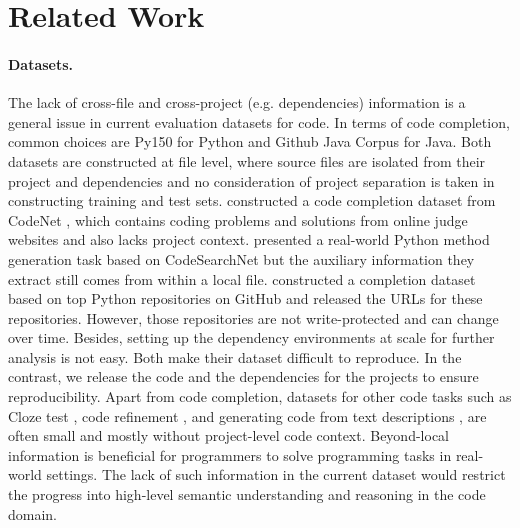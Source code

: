 \section{Related Work}
\label{sec:related-work}

\paragraph{Datasets.}
The lack of cross-file and cross-project (e.g. dependencies) information is a general issue in current evaluation datasets for code.
In terms of code completion, common choices are Py150 \citep{raychev2016probabilistic} for Python and Github Java Corpus \citep{allamanis2013mining} for Java. Both datasets are constructed at file level, where source files are isolated from their project and dependencies and no consideration of project separation is taken in constructing training and test sets.
\citet{lu2022reacc} constructed a code completion dataset from CodeNet \citep{puri2021project}, which contains coding problems and solutions from online judge websites and also lacks project context. 
\citet{clement2021long} presented a real-world Python method generation task based on CodeSearchNet \citep{husain2019codesearchnet} but the auxiliary information they extract still comes from within a local file. 
\citet{svyatkovskiy2021fast} constructed a completion dataset based on top Python repositories on GitHub and released the URLs for these repositories. 
However, those repositories are not write-protected and can change over time. Besides, setting up the dependency environments at scale for further analysis is not easy. 
Both make their dataset difficult to reproduce.
In the contrast, we release the code and the dependencies for the projects to ensure reproducibility.
Apart from code completion, datasets for other code tasks such as Cloze test \citep[e.g.][]{feng2020codebert}, code refinement \citep[e.g.][]{tufano2019empirical, yasunaga2021break, haque2022fixeval}, and generating code from text descriptions \citep[e.g.][]{chen2021evaluating, hendrycks2021measuring, austin2021program}, are often small and mostly without project-level code context. 
Beyond-local information is beneficial for programmers to solve programming tasks in real-world settings. The lack of such information in the current dataset would restrict the progress into high-level semantic understanding and reasoning in the code domain.


